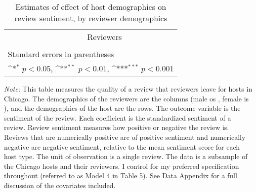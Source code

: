 \documentclass[11pt, oneside]{article}
\begin{document}
\centering
\begin{landscape}
	\begin{table}[htbp]\centering
		\def\sym#1{\ifmmode^{#1}\else\(^{#1}\)\fi}
		\caption{Estimates of effect of host demographics on review sentiment, by reviewer demographics}
		\begin{tabular}{l *{4}{c}}
			\hline\hline
			&\multicolumn{4}{c}{Reviewers} \\
			\cmidrule(r){2-5}\\
				
			\hline\hline
			\multicolumn{5}{l}{\footnotesize Standard errors in parentheses}\\
			\multicolumn{5}{l}{\footnotesize \sym{*} \(p<0.05\), \sym{**} \(p<0.01\), \sym{***} \(p<0.001\)}\\
		\end{tabular}
		\begin{tablenotes}
			
			\item {\it Note:} This table measures the quality of a review that reviewers leave for hosts in Chicago. The demographics of the reviewers are the columns (male os , female is ), and the demographics of the host are the rows. The outcome variable is the sentiment of the review. Each coefficient is the standardized sentiment of a review. Review sentiment measures how positive or negative the review is. Reviews that are numerically positive are of positive sentiment and numerically negative are negative sentiment, relative to the mean sentiment score for each host type. The unit of observation is a single review. The data is a subsample of the Chicago hosts and their reviewers. I control for my preferred specification throughout (referred to as Model 4 in Table 5). See Data Appendix for a full discussion of the covariates included. 
			
		\end{tablenotes}
		
	\end{table}
\end{landscape}
\end{document}

